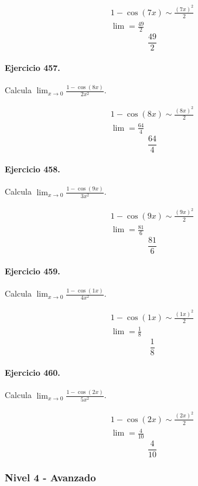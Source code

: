 \documentclass[11pt,a4paper]{article}
\begin{document}
\[
\begin{aligned}
1-\cos(7x)\sim \frac{(7x)^2}{2}\\
\lim=\frac{49}{2}
\end{aligned}
\]
\[\boxed{\frac{49}{2}}\]


\paragraph{Ejercicio 457.} Calcula $\displaystyle\lim_{x\to0}\frac{1-\cos(8x)}{2x^2}$.

\[
\begin{aligned}
1-\cos(8x)\sim \frac{(8x)^2}{2}\\
\lim=\frac{64}{4}
\end{aligned}
\]
\[\boxed{\frac{64}{4}}\]


\paragraph{Ejercicio 458.} Calcula $\displaystyle\lim_{x\to0}\frac{1-\cos(9x)}{3x^2}$.

\[
\begin{aligned}
1-\cos(9x)\sim \frac{(9x)^2}{2}\\
\lim=\frac{81}{6}
\end{aligned}
\]
\[\boxed{\frac{81}{6}}\]


\paragraph{Ejercicio 459.} Calcula $\displaystyle\lim_{x\to0}\frac{1-\cos(1x)}{4x^2}$.

\[
\begin{aligned}
1-\cos(1x)\sim \frac{(1x)^2}{2}\\
\lim=\frac{1}{8}
\end{aligned}
\]
\[\boxed{\frac{1}{8}}\]


\paragraph{Ejercicio 460.} Calcula $\displaystyle\lim_{x\to0}\frac{1-\cos(2x)}{5x^2}$.

\[
\begin{aligned}
1-\cos(2x)\sim \frac{(2x)^2}{2}\\
\lim=\frac{4}{10}
\end{aligned}
\]
\[\boxed{\frac{4}{10}}\]


\newpage

\subsubsection*{Nivel 4 - Avanzado}
\end{document}
